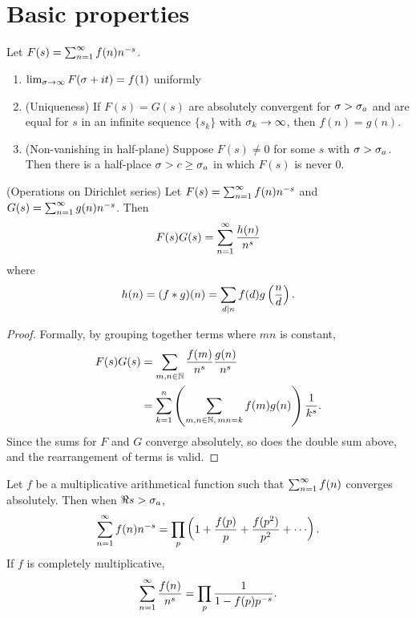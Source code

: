 \section{Basic properties}
\begin{pr}
Let $F(s)=\sum_{n=1}^{\infty} f(n)n^{-s}$.
\begin{enumerate}
\item $\lim_{\sigma\to \infty} F(\sigma+it)=f(1)$ uniformly
\item (Uniqueness) If $F(s)=G(s)$ are absolutely convergent for $\sigma>\sigma_a$ and are equal for $s$ in an infinite sequence $\{s_k\}$ with $\sigma_k\to \infty$, then $f(n)=g(n)$.
\item (Non-vanishing in half-plane) Suppose $F(s)\ne 0$ for some $s$ with $\sigma>\sigma_a$. Then there is a half-place $\sigma>c\ge \sigma_a$ in which $F(s)$ is never 0.
\end{enumerate}
\end{pr}
\begin{pr}(Operations on Dirichlet series)
Let $F(s)=\sum_{n=1}^{\infty} f(n)n^{-s}$ and $G(s)=\sum_{n=1}^{\infty} g(n)n^{-s}$.
%
Then
\[
F(s)G(s)=\sum_{n=1}^{\infty} \frac{h(n)}{n^s}
\]
where
\[
h(n)=(f*g)(n)=\sum_{d\mid n} f(d)g\left( {\frac{n}{d}} \right).
\]
\end{pr}
\begin{proof}
Formally, by grouping together terms where $mn$ is constant,
\begin{align*}
F(s)G(s)&=\sum_{m,n\in \mathbb{N}} \frac{f(m)}{n^s}\frac{g(n)}{n^{s}}\\
&=\sum_{k=1}^n\left( {\sum_{m,n\in \mathbb{N},\, mn=k} f(m)g(n)} \right)\frac{1}{k^s}.
\end{align*}
Since the sums for $F$ and $G$ converge absolutely, so does the double sum above, and the rearrangement of terms is valid.
\end{proof}
\begin{thm}%
Let $f$ be a multiplicative arithmetical function such that $\sum_{n=1}^{\infty} f(n)$ converges absolutely. Then when $\Re s>\sigma_a$,
\[
\sum_{n=1}^{\infty} f(n)n^{-s}=\prod_p \left( {1+\frac{f(p)}p+\frac{f(p^2)}{p^2}+\cdots} \right).
\]
If $f$ is completely multiplicative,
\[
\sum_{n=1}^{\infty} \frac{f(n)}{n^s}=\prod_p \frac{1}{1-f(p)p^{-s}}.
\]
\end{thm}
